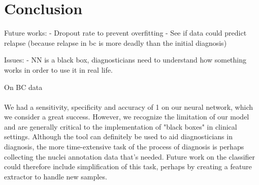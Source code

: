 \section{Conclusion}\label{sec:conclusion}

Future works: 
- Dropout rate to prevent overfitting
- See if data could predict relapse (because relapse in bc is more deadly than the initial diagnosis)

Issues: 
- NN is a black box, diagnosticians need to understand how something works in order to use it in real life.

On BC data
\\
\\
We had a sensitivity, specificity and accuracy of 1 on our neural network, which we consider a great success. However, we recognize the limitation of our model and are generally critical to the implementation of "black boxes" in clinical settings. Although the tool can definitely be used to aid diagnosticians in diagnosis, the more time-extensive task of the process of diagnosis is perhaps collecting the nuclei annotation data that's needed. Future work on the classifier could therefore include simplification of this task, perhaps by creating a feature extractor to handle new samples. 